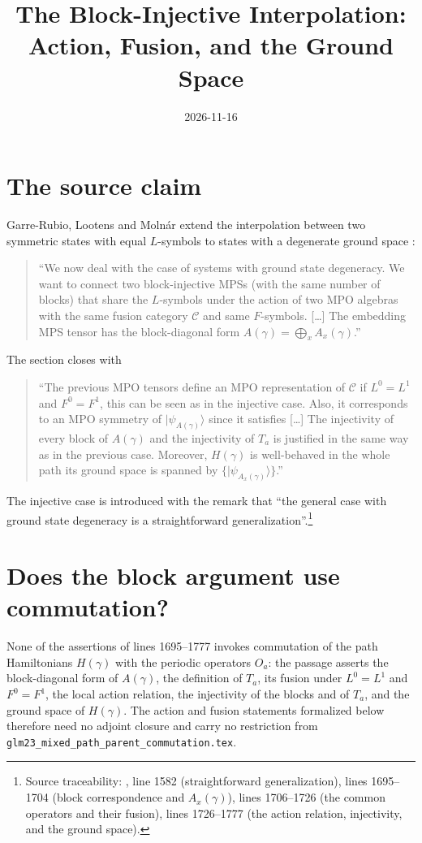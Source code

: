 \documentclass{article}
\title{The Block-Injective Interpolation: Action, Fusion, and the Ground Space}
\author{}
\date{2026-11-16}
\begin{document}
\maketitle
{}

\section{The source claim}
Garre-Rubio, Lootens and Moln\'ar extend the interpolation between two
symmetric states with equal $L$-symbols to states with a degenerate ground
space \cite[Section~5]{GarreRubio2023MPOSym}:
\begin{quote}
    ``We now deal with the case of systems with ground state degeneracy. We
    want to connect two block-injective MPSs (with the same number of
    blocks) that share the $L$-symbols under the action of two MPO algebras
    with the same fusion category $\mathcal{C}$ and same $F$-symbols.
    [\ldots] The embedding MPS tensor has the block-diagonal form
    $A(\gamma)=\bigoplus_x A_x(\gamma)$.''
\end{quote}
The section closes with
\begin{quote}
    ``The previous MPO tensors define an MPO representation of
    $\mathcal{C}$ if $L^0=L^1$ and $F^0=F^1$, this can be seen as in the
    injective case. Also, it corresponds to an MPO symmetry of
    $|\psi_{A(\gamma)}\rangle$ since it satisfies [\ldots] The injectivity
    of every block of $A(\gamma)$ and the injectivity of $T_a$ is justified
    in the same way as in the previous case. Moreover, $H(\gamma)$ is
    well-behaved in the whole path its ground space is spanned by
    $\{ |\psi_{A_x(\gamma)}\rangle\}$.''
\end{quote}
The injective case is introduced with the remark that ``the general case
with ground state degeneracy is a straightforward
generalization''.\footnote{Source traceability:
    , line 1582 (straightforward
    generalization), lines 1695--1704 (block correspondence and
    $A_x(\gamma)$), lines 1706--1726 (the common operators and their
    fusion), lines 1726--1777 (the action relation, injectivity, and the
    ground space).}

\section{Does the block argument use commutation?}
None of the assertions of lines 1695--1777 invokes commutation of the path
Hamiltonians $H(\gamma)$ with the periodic operators $O_a$: the passage
asserts the block-diagonal form of $A(\gamma)$, the definition of $T_a$,
its fusion under $L^0=L^1$ and $F^0=F^1$, the local action relation, the
injectivity of the blocks and of $T_a$, and the ground space of
$H(\gamma)$. The action and fusion statements formalized below therefore
need no adjoint closure and carry no restriction from
\texttt{glm23\_mixed\_path\_parent\_commutation.tex}.
\end{document}

